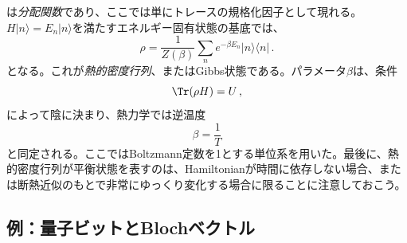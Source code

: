 \documentclass[a4paper,11pt,oneside]{article}
\theoremstyle{definition}
\numberwithin{equation}{section}
\begin{document}
は\textit{分配関数}であり、ここでは単にトレースの規格化因子として現れる。$H|n\rangle = E_n |n\rangle$を満たすエネルギー固有状態の基底では、
\begin{equation}
\rho
=
\frac{1}{Z(\beta)}
\sum_n e^{-\beta E_n} |n\rangle\langle n| \,.
\end{equation}
となる。これが\textit{熱的密度行列}、またはGibbs状態である。パラメータ$\beta$は、条件
\begin{equation}
\Tr(\rho H)=U \,,
\end{equation}
によって陰に決まり、熱力学では逆温度
\begin{equation}
\beta = \frac{1}{T}
\end{equation}
と同定される。ここではBoltzmann定数を1とする単位系を用いた。最後に、熱的密度行列が平衡状態を表すのは、Hamiltonianが時間に依存しない場合、または断熱近似のもとで非常にゆっくり変化する場合に限ることに注意しておこう。





\subsection{例：量子ビットとBlochベクトル}
\end{document}
